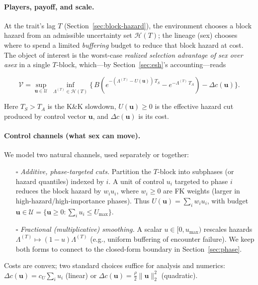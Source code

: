 \documentclass[11pt]{article}
\theoremstyle{upright}
\newcommand{\hazT}[1]{\Lambda^{(#1)}}          %
\begin{document}
\paragraph{Players, payoff, and scale.}
At the trait’s lag $T$ (Section~\ref{sec:block-hazard}), the environment chooses a block hazard from an admissible uncertainty set $\mathcal H(T)$; the lineage (sex) chooses where to spend a limited \emph{buffering} budget to reduce that block hazard at cost. The object of interest is the worst-case \emph{realized selection advantage of sex over asex} in a single $T$-block, which—by Section~\ref{sec:esh}’s accounting—reads

\begin{equation}\label{eq:minimax}
\mathcal V =
\sup_{\mathbf u\in \mathcal U}\;
\inf_{\hazT{T}\in \mathcal H(T)}
\Big\{\,B\!\left(e^{-(\hazT{T}-U(\mathbf u))\,T_S}-e^{-\hazT{T}\,T_A}\right)-\Delta c(\mathbf u)\Big\}.
\end{equation}

Here $T_S>T_A$ is the K\&K slowdown, $U(\mathbf u)\ge 0$ is the effective hazard cut produced by control vector $\mathbf u$, and $\Delta c(\mathbf u)$ is its cost.

\paragraph{Control channels (what sex can move).}
We model two natural channels, used separately or together:
\begin{enumerate}[label=(C\arabic*)]
\item[$\square$] \emph{Additive, phase-targeted cuts.} Partition the $T$-block into subphases (or hazard quantiles) indexed by $i$. A unit of control $u_i$ targeted to phase $i$ reduces the block hazard by $w_i u_i$, where $w_i\ge 0$ are FK weights (larger in high-hazard/high-importance phases). Thus
$U(\mathbf u)=\sum_i w_i u_i$, with budget $\mathbf u\in\mathcal U=\{\mathbf u\ge 0:\sum_i u_i\le U_{\max}\}$.
\item[$\square$] \emph{Fractional (multiplicative) smoothing.} A scalar $u\in[0,u_{\max})$ rescales hazards $\hazT{T}\mapsto (1-u)\hazT{T}$ (e.g., uniform buffering of encounter failure). We keep both forms to connect to the closed-form boundary in Section~\ref{sec:phase}.
\end{enumerate}
Costs are convex; two standard choices suffice for analysis and numerics: $\Delta c(\mathbf u)=c_U\sum_i u_i$ (linear) or $\Delta c(\mathbf u)=\frac{\rho}{2}\|\mathbf u\|_2^2$ (quadratic).
\end{document}
